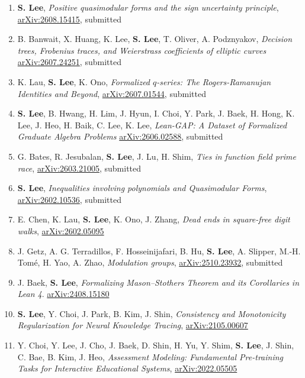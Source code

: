 \documentclass[letterpaper,11pt]{article}
\begin{document}
\begin{enumerate}
	\item \textbf{S. Lee}, \emph{Positive quasimodular forms and the sign uncertainty principle}, \href{https://arxiv.org/abs/2608.15415}{arXiv:2608.15415}, submitted
	\item B. Banwait, X. Huang, K. Lee, \textbf{S. Lee}, T. Oliver, A. Podznyakov, \emph{Decision trees, Frobenius traces, and Weierstrass coefficients of elliptic curves} \href{https://arxiv.org/abs/2607.24251}{arXiv:2607.24251}, submitted
	\item K. Lau, \textbf{S. Lee}, K. Ono, \emph{Formalized $q$-series: The Rogers-Ramanujan Identities and Beyond}, \href{https://arxiv.org/abs/2607.01544}{arXiv:2607.01544}, submitted
	\item \textbf{S. Lee}, B. Hwang, H. Lim, J. Hyun, I. Choi, Y. Park, J. Baek, H. Hong, K. Lee, J. Heo, H. Baik, C. Lee, K. Lee, \emph{Lean-GAP: A Dataset of Formalized Graduate Algebra Problems} \href{https://arxiv.org/abs/2606.02588}{arXiv:2606.02588}, submitted
	\item G. Bates, R. Jesubalan, \textbf{S. Lee}, J. Lu, H. Shim, \emph{Ties in function field prime race}, \href{https://arxiv.org/abs/2603.21005}{arXiv:2603.21005}, submitted
	\item \textbf{S. Lee}, \emph{Inequalities involving polynomials and Quasimodular Forms}, \href{https://arxiv.org/abs/2602.10536}{arXiv:2602.10536}, submitted
	\item E. Chen, K. Lau, \textbf{S. Lee}, K. Ono, J. Zhang, \emph{Dead ends in square-free digit walks}, \href{https://arxiv.org/abs/2602.05095}{arXiv:2602.05095}
	\item J. Getz, A. G. Terradillos, F. Hosseinijafari, B. Hu, \textbf{S. Lee}, A. Slipper, M.-H. Tomé, H. Yao, A. Zhao, \emph{Modulation groups}, \href{https://arxiv.org/abs/2510.23932}{arXiv:2510.23932}, submitted
	\item J. Baek, \textbf{S. Lee}, \emph{Formalizing Mason--Stothers Theorem and its Corollaries in Lean 4}. \href{https://arxiv.org/abs/2408.15180}{arXiv:2408.15180}
	\item \textbf{S. Lee}, Y. Choi, J. Park, B. Kim, J. Shin, \emph{Consistency and Monotonicity Regularization for Neural Knowledge Tracing}, \href{https://arxiv.org/abs/2105.00607}{arXiv:2105.00607}
    \item Y. Choi, Y. Lee, J. Cho, J. Baek, D. Shin, H. Yu, Y. Shim, \textbf{S. Lee}, J. Shin, C. Bae, B. Kim, J. Heo, \emph{Assessment Modeling: Fundamental Pre-training Tasks for Interactive Educational Systems}, \href{https://arxiv.org/abs/2002.05505}{arXiv:2022.05505}
\end{enumerate}
\end{document}
